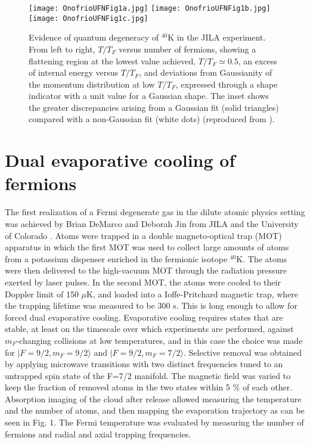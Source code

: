\documentclass[pra,letterpaper,twocolumn,showpacs,superscriptaddress]{revtex4}
\begin{document}
\begin{figure*}[t]
\begin{center}
\texttt{[image: OnofrioUFNFig1a.jpg]}
\texttt{[image: OnofrioUFNFig1b.jpg]}
\texttt{[image: OnofrioUFNFig1c.jpg]}
\caption{Evidence of quantum degeneracy of ${}^{40}$K in the JILA experiment. 
From left to right, $T/T_F$ versus number of fermions, showing a flattening 
region at the lowest value achieved, $T/T_F \simeq 0.5$, an excess of internal energy 
versus $T/T_F$, and deviations from Gaussianity of the momentum distribution
at low $T/T_F$, expressed through a shape indicator with a unit value for a Gaussian 
shape. The inset shows the greater discrepancies arising from a Gaussian fit (solid triangles)
compared with a non-Gaussian fit (white dots) (reproduced from \cite{DeMarco1999}).}
\label{}
\end{center}
\end{figure*}

\section{\bf{Dual evaporative cooling of fermions}}

The first realization of a Fermi degenerate gas in the dilute atomic physics setting was achieved by Brian DeMarco and Deborah Jin from 
JILA and the University of Colorado \cite{DeMarco1999}. Atoms were trapped in a double magneto-optical trap (MOT) apparatus in 
which the first MOT was used to collect large amounts of atoms from a potassium dispenser enriched in the fermionic isotope ${}^{40}$K. 
The atoms were then delivered to the high-vacuum MOT through the radiation pressure exerted by laser pulses. 
In the second MOT, the atoms were cooled to their Doppler limit of 150 $\mu$K, and loaded into a Ioffe-Pritchard 
magnetic trap, where the trapping lifetime was measured to be 300 s. This is long enough to allow for forced dual evaporative 
cooling. Evaporative cooling requires states that are stable, at least on the timescale over which experiments are performed, against 
$m_F$-changing collisions at low temperatures, and in this case the choice was made for $|F=9/2, m_F=9/2 \rangle$ and 
$|F=9/2, m_F=7/2 \rangle$. Selective removal was obtained by applying microwave transitions with two distinct frequencies tuned 
to an untrapped spin state of the F=7/2 manifold. The magnetic field was varied to keep the fraction of removed atoms in the two states 
within 5 $\%$ of each other.  Absorption imaging of the cloud after release allowed measuring the temperature and the number of atoms, and 
then mapping the evaporation trajectory as can be seen in Fig. 1. The Fermi temperature was evaluated by measuring the number of fermions and radial and 
axial trapping frequencies. 
\end{document}
